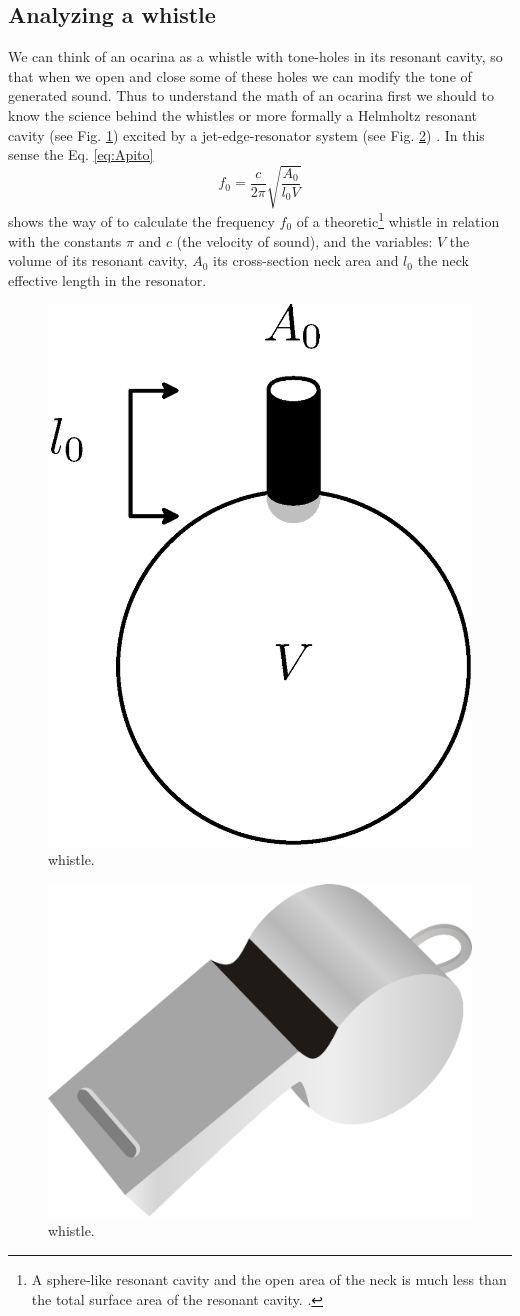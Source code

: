 \documentclass[11pt,twocolumn]{article}
\begin{document}
\subsection{Analyzing a whistle}
We can think of an ocarina as a whistle with tone-holes in its resonant cavity,
so that when we open and close some of these holes we can modify the tone of generated sound.
Thus to understand the math of an ocarina first we should to know the science behind the whistles  
or more formally a Helmholtz resonant cavity \cite{corning2011resonance} (see Fig. \ref{fig:resonador}) excited by a jet-edge-resonator system (see Fig. \ref{football-referee-whistle}) \cite[pp. 3]{gibiat2013acoustic} \cite[pp. 138]{nyborg1953characteristics}. 
In this sense the Eq. \ref{eq:Apito} 
\begin{equation} 
\label{eq:Apito}
 f_0 = \frac{c}{2 \pi} \sqrt{\frac{A_{0}}{l_{0}V} }  
\end{equation}
shows the way of to calculate the frequency $f_0$ of a theoretic\footnote{A sphere-like resonant cavity and the open area of the neck is much less than the total surface area of the resonant cavity. .} whistle \cite[pp. 3]{gibiat2013acoustic} \cite[pp. 5]{kobayashi20093d} \cite[pp. 265]{okadanumerical}
in relation with the constants $\pi$  and $c$ (the velocity of sound), and 
the variables: $V$ the volume of its resonant cavity,
$A_0$ its cross-section neck area and $l_0$ the neck effective length in the resonator.


\begin{figure}[ht!]
\centering
\includegraphics[width=0.350\columnwidth]{resonador.eps}
\caption{whistle. }
\label{fig:resonador}
\end{figure}

\begin{figure}[ht!]
\centering
\includegraphics[width=0.250\columnwidth]{football-referee-whistle.eps}
\caption{whistle. }
\label{football-referee-whistle}
\end{figure}
\end{document}
